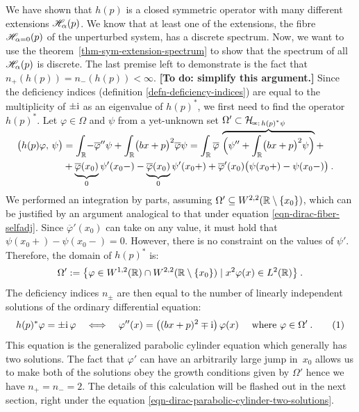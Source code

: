 We have shown that $h(p)$ is a closed symmetric operator with many different extensions $\mathscr{H}_\alpha(p)$. We know that at least one of the extensions, the fibre $\mathscr{H}_{\alpha = 0}(p)$ of the unperturbed system, has a discrete spectrum. Now, we want to use the theorem~\ref{thm-sym-extension-spectrum} to show that the spectrum of all $\mathscr{H}_\alpha(p)$ is discrete. The last premise left to demonstrate is the fact that $n_+(h(p)) = n_-(h(p)) < \infty$. \textbf{[To do: simplify this argument.]} Since the deficiency indices (definition \ref{defn-deficiency-indices}) are equal to the multiplicity of $\pm\mathrm{i}$ as an eigenvalue of $h(p)^*$, we first need to find the operator $h(p)^*$. Let $\varphi \in \Omega$ and $\psi$ from a yet-unknown set $\Omega'\subset\mathcal{H}$.
\begin{align*}
    \\[-2\baselineskip]
    \big( h(p) \varphi, \, \psi \big)
    &= \int_\R\! -\overline\varphi'' \psi
    + \int_\R\! \big( bx + p \big)^2 \overline\varphi\psi
    = \int_\R \overline\varphi \, \overbrace{\Big(
        \psi'' + \int_\R\! \big(bx + p\big)^2 \psi
    \Big)}^{=: \, h(p)^* \psi} + \ph{x}\\
    &+ \underbrace{\vph{\big|} \overline\varphi(x_0)}_0 \psi'(x_0-)
    - \underbrace{\vph{\big|} \overline\varphi(x_0)}_0 \psi'(x_0+)
    + \overline\varphi'(x_0) \big( \psi(x_0+) - \psi(x_0-) \big)
    \: .
\end{align*}
We performed an integration by parts, assuming $\Omega' \subseteq W^{2,2}(\mathbb{R} \setminus \{x_0\})$, which can be justified by an argument analogical to that under equation \eqref{eqn-dirac-fiber-selfadj}. Since $\overline\varphi'(x_0)$ can take on any value, it must hold that $\psi(x_0+) - \psi(x_0-) = 0$. However, there is no constraint on the values of $\psi'$. Therefore, the domain of $h(p)^*$ is:
\begin{equation*}
    \Omega' := \big\{
        \varphi \in W^{1,2}(\mathbb{R}) \cap W^{2,2}(\mathbb{R} \setminus \{x_0\})
        \; | \;
        x^2 \varphi(x) \in L^2(\mathbb{R})
    \big\}
    \: .
\end{equation*}
The deficiency indices $n_\pm$ are then equal to the number of linearly independent solutions of the ordinary differential equation:
\begin{equation*}
    h(p)^* \varphi = \pm \i \, \varphi
    \quad \Longleftrightarrow \quad
    \varphi''(x) = \big( (bx + p)^2 \mp \i \big) \, \varphi(x)
    \quad \text{ where } \varphi \in \Omega'
    \: .
    \numberthis\label{eqn-dirac-deficiency-indices-ode}
\end{equation*}
This equation is the generalized parabolic cylinder equation which generally has two solutions. The fact that $\varphi'$ can have an arbitrarily large jump in~$x_0$ allows us to make both of the solutions obey the growth conditions given by $\Omega'$ hence we have $n_+ = n_- = 2$. The details of this calculation will be flashed out in the next section, right under the equation \eqref{eqn-dirac-parabolic-cylinder-two-solutions}.

